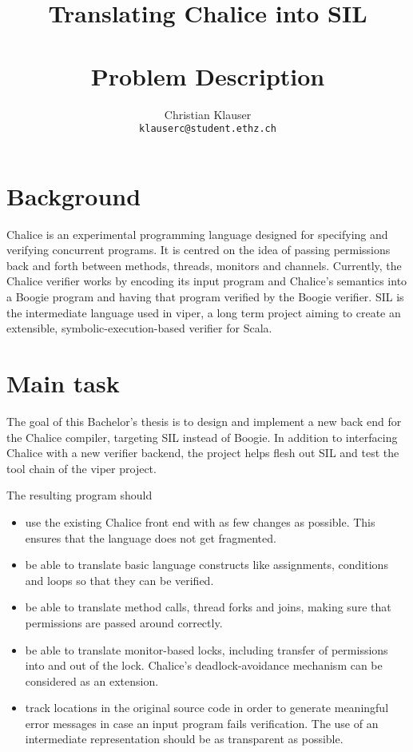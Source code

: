 \documentclass[11pt]{article} %
\title{{\Huge Translating Chalice into SIL}\\{\small\ }\\{\huge Problem Description}}
\author{Christian Klauser\\ \texttt{klauserc@student.ethz.ch}}
\begin{document}
\maketitle

\section{Background}
Chalice is an experimental programming language designed for specifying and verifying concurrent programs. It is centred on the idea of passing permissions back and forth between methods, threads, monitors and channels. Currently, the Chalice verifier works by encoding its input program and Chalice's semantics into a Boogie program and having that program verified by the Boogie verifier. 
SIL is the intermediate language used in viper, a long term project aiming to create an extensible, symbolic-execution-based verifier for Scala.

\section{Main task}
The goal of this Bachelor's thesis is to design and implement a new back end for the Chalice compiler, targeting SIL instead of Boogie. In addition to interfacing Chalice with a new verifier backend, the project helps flesh out SIL and test the tool chain of the viper project.

The resulting program should
\begin{itemize}
\item use the existing Chalice front end with as few changes as possible. This ensures that the language does not get fragmented.
\item be able to translate basic language constructs like assignments, conditions and loops so that they can be verified.
\item be able to translate method calls, thread forks and joins, making sure that permissions are passed around correctly.
\item be able to translate monitor-based locks, including transfer of permissions into and out of the lock. Chalice's deadlock-avoidance mechanism can be considered as an extension.
\item track locations in the original source code in order to generate meaningful error messages in case an input program fails verification. The use of an intermediate representation should be as transparent as possible.
\end{itemize}
\end{document}
